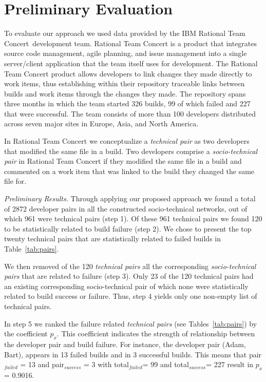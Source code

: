 \documentclass[conference]{IEEEtran}
\begin{document}
\section{Preliminary Evaluation}
To evaluate our approach we used data provided by the IBM Rational Team Concert\texttrademark\ development team.
Rational Team Concert is a product that integrates source code management, agile planning, and issue management into a single server/client application that the team itself uses for development.
The Rational Team Concert product allows developers to link changes they made directly to work items, thus establishing within their repository traceable links between builds and work items through the changes they made.
The repository spans three months in which the team started 326 builds, 99 of which failed and 227 that were successful.
The team consists of more than 100 developers distributed across seven major sites in Europe, Asia, and North America.


In Rational Team Concert we conceptualize a \emph{technical pair} as two developers that modified the same file in a build.
Two developers comprise a \emph{socio-technical pair} in Rational Team Concert if they modified the same file in a build and commented on a work item that was linked to the build they changed the same file for.



\emph{Preliminary Results.}
Through applying our proposed approach we found a total of 2872 developer pairs in all the constructed socio-technical networks, out of which 961 were technical pairs (step 1).
Of these 961 technical pairs we found 120 to be statistically related to build failure (step 2). 
We chose to present the top twenty technical pairs that are statistically related to failed builds in Table~\ref{tab:pairs}.

We then removed of the 120 \emph{technical pairs} all the corresponding \emph{socio-technical pairs} that are related to failure (step 3).
Only 23 of the 120 technical pairs had an existing corresponding socio-technical pair of which none were statistically related to build success or failure.
Thus, step 4 yields only one non-empty list of technical pairs.

In step 5 we ranked the failure related \emph{technical pairs} (see Tables~\ref{tab:pairs})
by the coefficient $p_{x}$. This coefficient indicates the strength of
relationship between the developer pair and build failure. For instance, the
developer pair (Adam, Bart), appears in 13 failed builds and in 3
successful builds. This means that pair$_{failed}$ = 13 and pair$_{success}$ = 3
with total$_{failed}$= 99 and total$_{success}$= 227 result in $p_x$= 0.9016.
\end{document}
